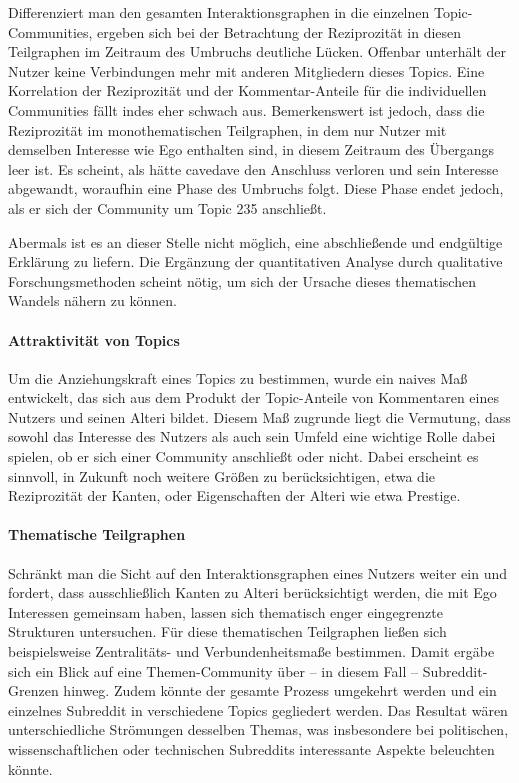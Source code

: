 \documentclass[11pt,a4paper,twoside]{article}
\let\oldpar\paragraph
\renewcommand{\paragraph}{\oldpar*}
\begin{document}
Differenziert man den gesamten Interaktionsgraphen in die einzelnen
Topic-Communities, ergeben sich bei der Betrachtung der Reziprozität in
diesen Teilgraphen im Zeitraum des Umbruchs deutliche Lücken. Offenbar
unterhält der Nutzer keine Verbindungen mehr mit anderen Mitgliedern
dieses Topics. Eine Korrelation der Reziprozität und der
Kommentar-Anteile für die individuellen Communities fällt indes eher
schwach aus. Bemerkenswert ist jedoch, dass die Reziprozität im
monothematischen Teilgraphen, in dem nur Nutzer mit demselben Interesse
wie Ego enthalten sind, in diesem Zeitraum des Übergangs leer ist. Es
scheint, als hätte cavedave den Anschluss verloren und sein Interesse
abgewandt, woraufhin eine Phase des Umbruchs folgt. Diese Phase endet
jedoch, als er sich der Community um Topic 235 anschließt.

Abermals ist es an dieser Stelle nicht möglich, eine abschließende und
endgültige Erklärung zu liefern. Die Ergänzung der quantitativen Analyse
durch qualitative Forschungsmethoden scheint nötig, um sich der Ursache
dieses thematischen Wandels nähern zu können.

\hypertarget{attraktivitat-von-topics-1}{%
\paragraph{Attraktivität von Topics}\label{attraktivitat-von-topics-1}}

Um die Anziehungskraft eines Topics zu bestimmen, wurde ein naives Maß
entwickelt, das sich aus dem Produkt der Topic-Anteile von Kommentaren
eines Nutzers und seinen Alteri bildet. Diesem Maß zugrunde liegt die
Vermutung, dass sowohl das Interesse des Nutzers als auch sein Umfeld
eine wichtige Rolle dabei spielen, ob er sich einer Community anschließt
oder nicht. Dabei erscheint es sinnvoll, in Zukunft noch weitere Größen
zu berücksichtigen, etwa die Reziprozität der Kanten, oder Eigenschaften
der Alteri wie etwa Prestige.

\hypertarget{thematische-teilgraphen-1}{%
\paragraph{Thematische Teilgraphen}\label{thematische-teilgraphen-1}}

Schränkt man die Sicht auf den Interaktionsgraphen eines Nutzers weiter
ein und fordert, dass ausschließlich Kanten zu Alteri berücksichtigt
werden, die mit Ego Interessen gemeinsam haben, lassen sich thematisch
enger eingegrenzte Strukturen untersuchen. Für diese thematischen
Teilgraphen ließen sich beispielsweise Zentralitäts- und
Verbundenheitsmaße bestimmen. Damit ergäbe sich ein Blick auf eine
Themen-Community über -- in diesem Fall -- Subreddit-Grenzen hinweg.
Zudem könnte der gesamte Prozess umgekehrt werden und ein einzelnes
Subreddit in verschiedene Topics gegliedert werden. Das Resultat wären
unterschiedliche Strömungen desselben Themas, was insbesondere bei
politischen, wissenschaftlichen oder technischen Subreddits interessante
Aspekte beleuchten könnte.
\end{document}

